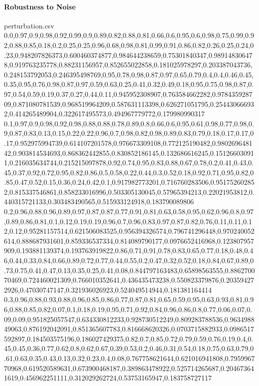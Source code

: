 \documentclass{llncs}
\begin{document}
\paragraph{Robustness to Noise}
\begin{filecontents*}{perturbation.csv}
	0.0,0.97,0.9,0.98,0.92,0.99,0.9,0.89,0.82,0.88,0.81,0.66,0.6,0.95,0.6,0.98,0.75,0.99,0.92,0.88,0.85,0.18,0.2,0.25,0.25,0.96,0.68,0.98,0.81,0.99,0.91,0.86,0.82,0.26,0.25,0.24,0.23,0.948207826373,0.600460374877,0.984644238659,0.75301840347,0.989148306478,0.919763235778,0.88231156957,0.852655022858,0.181025978297,0.203387043736,0.248153792053,0.246395498769,0.95,0.78,0.98,0.87,0.97,0.65,0.79,0.4,0.4,0.46,0.45,0.35,0.95,0.76,0.98,0.87,0.97,0.59,0.63,0.25,0.41,0.32,0.49,0.18,0.95,0.75,0.98,0.87,0.97,0.54,0.59,0.19,0.37,0.27,0.44,0.11,0.945952308907,0.763584662282,0.978435928709,0.871080781539,0.968519964209,0.587631113398,0.626271051795,0.254430666932,0.414265489904,0.322617495573,0.494967779772,0.179980990317
	0.1,0.97,0.9,0.98,0.92,0.98,0.88,0.88,0.78,0.89,0.8,0.66,0.6,0.95,0.61,0.98,0.77,0.98,0.9,0.87,0.83,0.13,0.15,0.22,0.22,0.96,0.7,0.98,0.82,0.98,0.89,0.83,0.79,0.18,0.17,0.17,0.17,0.952975994739,0.614107201578,0.976673309108,0.772125190482,0.980269648142,0.903814534693,0.868362442855,0.830852186145,0.132686616245,0.151266030911,0.216035634744,0.215215097878,0.92,0.74,0.95,0.83,0.88,0.67,0.78,0.2,0.41,0.43,0.45,0.37,0.92,0.72,0.95,0.82,0.86,0.5,0.58,0.22,0.44,0.3,0.52,0.18,0.92,0.71,0.95,0.82,0.85,0.47,0.52,0.15,0.36,0.24,0.42,0.1,0.917982773201,0.716760283506,0.951752602852,0.815337546861,0.858233016996,0.503305130045,0.57965394213,0.22021953812,0.440315721133,0.303483490565,0.515933124918,0.183790089806
	0.2,0.96,0.88,0.96,0.89,0.97,0.87,0.87,0.77,0.91,0.81,0.63,0.58,0.95,0.62,0.96,0.8,0.97,0.89,0.86,0.81,0.1,0.12,0.19,0.19,0.96,0.7,0.96,0.83,0.97,0.87,0.82,0.76,0.11,0.11,0.12,0.12,0.95281157514,0.621506083525,0.956394326574,0.796741296448,0.970240052614,0.888687931601,0.859336537334,0.814089790177,0.0976652416968,0.123807957909,0.193881139374,0.193763919822,0.86,0.71,0.91,0.78,0.83,0.65,0.77,0.18,0.48,0.46,0.44,0.33,0.84,0.66,0.89,0.72,0.77,0.44,0.55,0.2,0.47,0.32,0.52,0.18,0.84,0.67,0.89,0.73,0.75,0.41,0.47,0.13,0.35,0.25,0.41,0.08,0.844797163483,0.65898563555,0.886270070469,0.724460021309,0.766010352641,0.436435473238,0.550823379876,0.203594272926,0.47030747147,0.321936026923,0.524049514944,0.181381164414
	0.3,0.96,0.88,0.93,0.88,0.96,0.85,0.86,0.77,0.87,0.81,0.65,0.59,0.95,0.63,0.93,0.81,0.96,0.88,0.85,0.82,0.07,0.1,0.18,0.19,0.95,0.71,0.92,0.84,0.96,0.86,0.8,0.77,0.06,0.07,0.09,0.09,0.951825057547,0.634330812233,0.928730512249,0.809283788536,0.963498849063,0.876192042091,0.851365607783,0.816668620326,0.0703715882933,0.0986517592897,0.184503575196,0.186027429375,0.82,0.7,0.85,0.72,0.79,0.59,0.76,0.19,0.4,0.45,0.45,0.36,0.77,0.62,0.8,0.62,0.67,0.39,0.53,0.2,0.46,0.31,0.54,0.18,0.75,0.63,0.79,0.61,0.63,0.35,0.43,0.13,0.32,0.23,0.4,0.08,0.767758621644,0.621016941808,0.795996770968,0.619520589631,0.673900468187,0.389863478922,0.525714265687,0.204673641619,0.456962251111,0.312029262724,0.53753165947,0.183758727117

\end{filecontents*}
\end{document}
